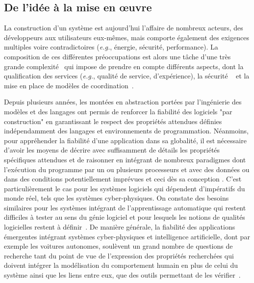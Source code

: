 \documentclass[11pt]{article}
\newcommand{\eg}[0]{\emph{e.g.},\xspace}
\newcommand{\defi}[1]{\cite[défi]{#1}}
\begin{document}
\subsection{De l'idée à la mise en {\oe}uvre\label{ss:fiabilite:continuite}} 
La construction d'un système est aujourd'hui l'affaire de nombreux acteurs, des développeurs aux utilisateurs eux-mêmes, mais comporte également des exigences multiples voire contradictoires (\eg énergie, sécurité, performance). La composition de ces différentes préoccupations est alors une tâche d'une très grande complexité~\defi{argumentation} qui impose de prendre en compte différents aspects, dont la qualification des services (\eg qualité de service, d'expérience), la sécurité
~\defi{securite} et la mise en place de modèles de coordination~\defi{reconfiguration}.


Depuis plusieurs années, les montées en abstraction portées par l'ingénierie des modèles et des langages ont permis de renforcer la fiabilité des logiciels "par construction" en garantissant le respect des propriétés attendues définies indépendamment des langages et environnements de programmation. 
Néanmoins, pour appréhender la fiabilité d'une application dans sa globalité, il est nécessaire d'avoir les moyens de décrire avec suffisamment de détails les propriétés spécifiques attendues et de raisonner en intégrant de nombreux paradigmes dont l’exécution du programme par un ou plusieurs processeurs et avec des données ou dans des conditions potentiellement imprévues et ceci dès sa conception \defi{reconfiguration, compilation}. 
%
C'est particulièrement le cas pour les systèmes logiciels qui dépendent d'impératifs du monde réel, tels que les systèmes cyber-physiques. 
On constate des besoins similaires pour les systèmes intégrant de l'apprentissage automatique qui restent difficiles à tester au sens du génie logiciel et pour lesquels les notions de qualités logicielles restent à définir~\defi{IA}.  
De manière générale, la fiabilité des  applications émergentes intégrant  systèmes cyber-physiques et intelligence artificielle, dont par exemple les voitures autonomes, soulèvent  un grand nombre de questions de recherche tant du point de vue de l'expression des propriétés recherchées qui doivent intégrer la modélisation du comportement humain en plus de celui du système ainsi que les liens entre eux, que des outils permettant de les vérifier~\defi{emergents}.
\end{document}
